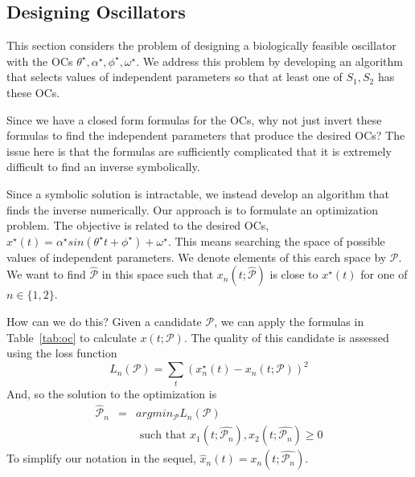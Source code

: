 \documentclass{bmcart}
\newcommand{\tab}[1]{Table~\ref{#1}}
\begin{document}
    
\subsection*{Designing Oscillators}
This section considers the problem of designing a biologically feasible oscillator with the OCs
$\theta^{\star}, \alpha^{\star}, \phi^{\star}, \omega^{\star}$. We address this problem by developing an algorithm that selects
values of independent
parameters so that at least one of $S_1, S_2$ has these OCs.

Since we have a closed form formulas for the OCs, why not just invert these formulas to find the independent parameters that produce the desired OCs?
The issue here is that the formulas are sufficiently complicated that it is extremely difficult to find an inverse symbolically.

Since a symbolic solution is intractable, we instead
develop an algorithm that finds the inverse numerically. Our approach is to formulate an optimization problem. The objective is related to the desired OCs,
$x^{\star}(t) = \alpha^{\star} sin(\theta^{\star} t + \phi^{\star}) + \omega^{\star}$. This means searching the space of possible values of independent parameters. We denote elements of this earch space by $\mathcal{P}$. We want to find $\hat{\mathcal{P}}$ in this space such that $x_n(t; \hat{\mathcal{P}})$ is close to $x^{\star}(t)$ for one of $n \in \{1, 2\}.$

How can we do this? Given a candidate $\mathcal{P}$, we can apply the formulas in \tab{tab:oc} to calculate $x(t; \mathcal{P}).$ The quality of this candidate is assessed using the loss function
\begin{equation}
L_n (\mathcal{P}) = \sum_t \left( x^{\star}_n(t) -x_n(t; \mathcal{P}) \right)^2
\label{eq:loss}
\end{equation}
And, so the solution to the optimization is
\begin{eqnarray*}
    \hat{\mathcal{P}}_n & = & argmin_{\mathcal{P}} L_n
    (\mathcal{P}) \\
    & & \text{ such that } x_1 (t; \hat{\mathcal{P}_n}), x_2(t; \hat{\mathcal{P}_n}) \geq 0
\end{eqnarray*}
To simplify our notation in the sequel, $\hat{x}_n (t) = x_n(t; \hat{\mathcal{P}_n}).$
\end{document}
